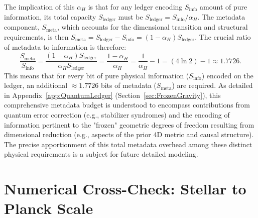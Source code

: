 \documentclass[a4paper, 12pt, oneside]{book}
\numberwithin{equation}{chapter}
\begin{document}
The implication of this $\alpha_H$ is that for any ledger encoding $S_{\text{info}}$ amount of pure information, its total capacity $S_{\text{ledger}}$ must be $S_{\text{ledger}} = S_{\text{info}}/\alpha_H$. The metadata component, $S_{\text{meta}}$, which accounts for the dimensional transition and structural requirements, is then $S_{\text{meta}} = S_{\text{ledger}} - S_{\text{info}} = (1-\alpha_H)S_{\text{ledger}}$. The crucial ratio of metadata to information is therefore:
\[
\frac{S_{\text{meta}}}{S_{\text{info}}} = \frac{(1-\alpha_H)S_{\text{ledger}}}{\alpha_H S_{\text{ledger}}} = \frac{1-\alpha_H}{\alpha_H} = \frac{1}{\alpha_H} - 1 = (4\ln 2) - 1 \approx 1.7726.
\]
This means that for every bit of pure physical information ($S_{\text{info}}$) encoded on the ledger, an additional $\approx 1.7726$ bits of metadata ($S_{\text{meta}}$) are required. As detailed in Appendix~\ref{app:QuantumLedger} (Section~\ref{sec:FrozenGravity}), this comprehensive metadata budget is understood to encompass contributions from quantum error correction (e.g., stabilizer syndromes) and the encoding of information pertinent to the "frozen" geometric degrees of freedom resulting from dimensional reduction (e.g., aspects of the prior 4D metric and causal structure). The precise apportionment of this total metadata overhead among these distinct physical requirements is a subject for future detailed modeling.

\section[Numerical Cross-Check]{Numerical Cross-Check: Stellar to Planck Scale}
\label{app:Numerical}
\end{document}
